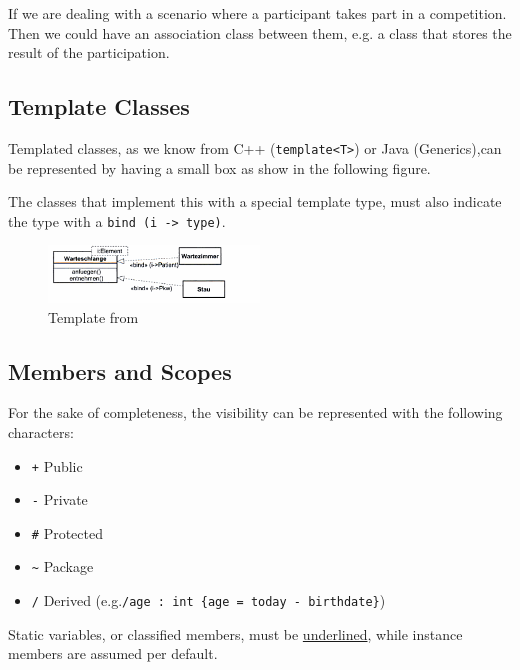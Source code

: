 \documentclass[../main/main.tex]{subfiles}
\begin{document}
If we are dealing with a scenario where a participant takes part in a
competition. Then we could have an association class between them, e.g. a
class that stores the result of the participation. 


\subsection{Template Classes}

Templated classes, as we know from C++ (\lstinline|template<T>|) or Java
(Generics),can be represented by having a small box as show in the following
figure. 

The classes that implement this with a special template type, must also indicate
the type with a \lstinline|bind (i -> type)|.

\begin{figure}[h!]
  \includegraphics[width=0.5\textwidth]{../figures/umltemplate.png}
  \caption{Template from \cite{oestereich:kurzreferenz}}
\end{figure}


\subsection{Members and Scopes}

For the sake of completeness, the visibility can be represented with the
following characters: 

\begin{itemize}
  \item[] \lstinline|+| Public
  \item[] \lstinline|-| Private
  \item[] \lstinline|#| Protected
  \item[] \lstinline|~| Package
  \item[] \lstinline|/| Derived (e.g.\lstinline|/age : int {age = today - birthdate}|)
\end{itemize}

Static variables, or classified members, must be \underline{underlined}, while instance
members are assumed per default.
\end{document}
